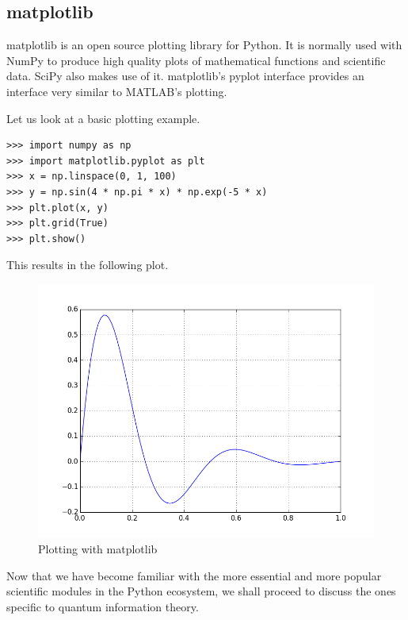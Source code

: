 \subsection{matplotlib}
matplotlib \cite{matplotlib} is an open source plotting library for Python. It is normally used with NumPy to produce high quality plots of mathematical functions and scientific data. SciPy also makes use of it. matplotlib's pyplot interface provides an interface very similar to MATLAB's plotting.
\par Let us look at a basic plotting example.
\begin{verbatim}
>>> import numpy as np
>>> import matplotlib.pyplot as plt
>>> x = np.linspace(0, 1, 100)
>>> y = np.sin(4 * np.pi * x) * np.exp(-5 * x)
>>> plt.plot(x, y)
>>> plt.grid(True)
>>> plt.show()
\end{verbatim}
This results in the following plot.
\begin{figure}[H]
  \begin{center}
    \includegraphics[scale=0.55]{figures/matplotlibexample.png}
    \caption{Plotting with matplotlib}
    \label{fig: matplotlib Example}
  \end{center}
\end{figure}

\par Now that we have become familiar with the more essential and more popular scientific modules in the Python ecosystem, we shall proceed to discuss the ones specific to quantum information theory.

